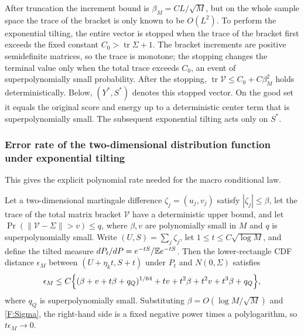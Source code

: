 After truncation the increment bound is $\beta_M=CL/\sqrt M$, but on the whole sample space the
trace of the bracket is only known to be $O(L^2)$. To perform the exponential tilting, the entire
vector is stopped when the trace of the bracket first exceeds the fixed constant
$C_0>\operatorname{tr}\Sigma+1$. The bracket increments are positive semidefinite matrices, so the
trace is monotone; the stopping changes the terminal value only when the total trace exceeds
$C_0$, an event of superpolynomially small probability. After the stopping,
$\operatorname{tr}\mathcal V\le C_0+C\beta_M^2$ holds deterministically. Below, $(Y^*,S^*)$
denotes this stopped vector. On the good set it equals the original score and energy up to a
deterministic center term that is superpolynomially small. The subsequent exponential tilting acts
only on $S^*$.

\subsubsection{Error rate of the two-dimensional distribution function under exponential tilting}

This gives the explicit polynomial rate needed for the macro conditional law.

\begin{lemma}\label{F:lem:tilt}
Let a two-dimensional martingale difference $\zeta_j=(u_j,v_j)$ satisfy $|\zeta_j|\le\beta$, let
the trace of the total matrix bracket $\mathcal V$ have a deterministic upper bound, and let
$\Pr(\|\mathcal V-\Sigma\|>v)\le q$, where $\beta,v$ are polynomially small in $M$ and $q$ is
superpolynomially small. Write $(U,S)=\sum_j\zeta_j$, let $1\le t\le C\sqrt{\log M}$, and define
the tilted measure $dP_t/dP=e^{-tS}/\mathbb E e^{-tS}$. Then the lower-rectangle CDF distance
$\epsilon_M$ between $(U+\eta_kt,S+t)$ under $P_t$ and $N(0,\Sigma)$ satisfies
\begin{equation}
\epsilon_M\le C\Bigl\{(\beta+v+t\beta+q_Q)^{1/64}+tv+t^2\beta+t^2v+t^3\beta+q_Q\Bigr\},\label{F:rate}
\end{equation}
where $q_Q$ is superpolynomially small. Substituting $\beta=O(\log M/\sqrt M)$ and
\eqref{F:Sigma}, the right-hand side is a fixed negative power times a polylogarithm, so
$t\epsilon_M\to0$.
\end{lemma}

